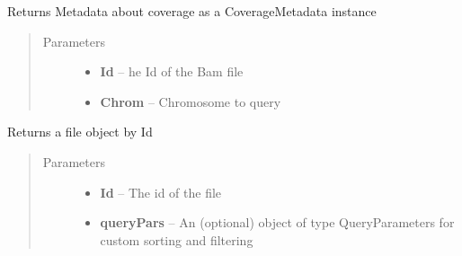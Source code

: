 \documentclass[letterpaper,10pt,english]{sphinxmanual}
\begin{document}
\begin{fulllineitems}
\begin{fulllineitems}
\begin{quote}
\begin{description}
\end{description}\end{quote}

\end{fulllineitems}


\begin{fulllineitems}
\label{Available modules:BaseSpacePy.api.BaseSpaceAPI.BaseSpaceAPI.getCoverageMetaInfo}
Returns Metadata about coverage as a CoverageMetadata instance
\begin{quote}\begin{description}
\item[{Parameters}] \leavevmode\begin{itemize}
\item {} 
\textbf{Id} -- he Id of the Bam file

\item {} 
\textbf{Chrom} -- Chromosome to query

\end{itemize}

\end{description}\end{quote}

\end{fulllineitems}


\begin{fulllineitems}
\label{Available modules:BaseSpacePy.api.BaseSpaceAPI.BaseSpaceAPI.getFileById}
Returns a file object by Id
\begin{quote}\begin{description}
\item[{Parameters}] \leavevmode\begin{itemize}
\item {} 
\textbf{Id} -- The id of the file

\item {} 
\textbf{queryPars} -- An (optional) object of type QueryParameters for custom sorting and filtering

\end{itemize}

\end{description}\end{quote}


\end{fulllineitems}
\end{fulllineitems}
\end{document}
